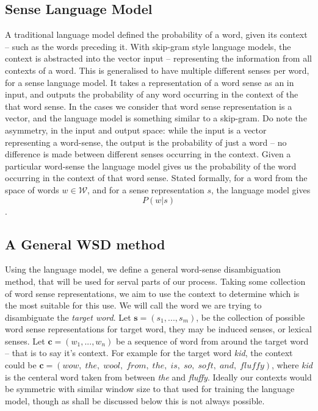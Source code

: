 \documentclass{sig-alternate}
\newcommand{\W}{\mathcal{W}}
\begin{document}
\subsection{Sense Language Model}
A traditional language model defined the probability of a word, given its context -- such as the words preceding it.
With skip-gram style language models, the context is abstracted into the vector input -- representing the information from all contexts of a word. This is generalised to have multiple different senses per word, for a sense language model.
It takes a representation of a word sense as an in input, and outputs the probability of any word occurring in the context of the that word sense. In the cases we consider that word sense representation is a vector, and the language model is something similar to a skip-gram. Do note the asymmetry, in the input and output space: while the input is a vector representing a word-sense, the output is the probability of just a word -- no difference is made between different senses occurring in the context. Given a particular word-sense the language model gives us the probability of the word occurring in the context of that word sense. Stated formally, for a word from the space of words $w\in \W$, and for a sense representation $s$, the language model gives $$P(w | s)$$.

\subsection{A General WSD method}
Using the language model, we define a general word-sense disambiguation method, that will be used for serval parts of our process.
Taking some collection of word sense representations, we aim to use the context to determine which is the most suitable for this use.
We will call the word we are trying to disambiguate the \emph{target word}.
Let $\mathbf{s}=(s_{1},...,s_{m})$, be the collection of possible word sense representations for target word, they may be induced senses, or lexical senses.
Let $\mathbf{c}=(w_{1},...,w_{n})$ be a sequence of word from around the target word -- that is to say it's context.
For example for the target word \emph{kid}, the context could be \mbox{$\mathbf{c}=(wow,\; the,\; wool,\; from,\; the,\; is,\; so,\; soft,\; and,\; fluffy)$}, where \emph{kid} is the centeral word taken from between \emph{the} and \emph{fluffy}.
Ideally our contexts would be symmetric with similar window size to that used for training the language model, though as shall be discussed below this is not always possible.
 
\end{document}
